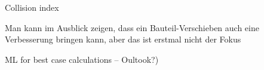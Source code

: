 				
						Collision index


Man kann im Ausblick zeigen, dass ein Bauteil-Verschieben auch eine Verbesserung bringen kann, aber das ist erstmal nicht der Fokus

ML for best case calculations – Oultook?)
